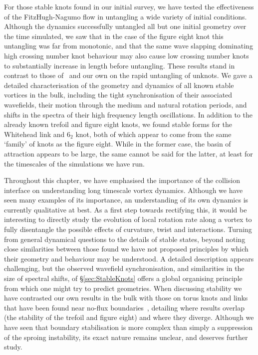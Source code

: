 For those stable knots found in our initial survey, we have tested the effectiveness of the FitzHugh-Nagumo flow in untangling a wide variety of initial conditions. Although the dynamics successfully untangled all but one initial geometry over the time simulated, we saw that in the case of the figure eight knot this untangling was far from monotonic, and that the same wave slapping dominating high crossing number knot behaviour may also cause low crossing number knots to substantially increase in length before untangling. These results stand in contrast to those of~\citep{Maucher2016} and our own on the rapid untangling of unknots. We gave a detailed characterisation of the geometry and dynamics of all known stable vortices in the bulk, including the tight synchronisation of their associated wavefields, their motion through the medium and natural rotation periods, and shifts in the spectra of their high frequency length oscillations. In addition to the already known trefoil and figure eight knots, we found stable forms for the Whitehead link and $6_2$ knot, both of which appear to come from the same `family' of knots as the figure eight. While in the former case, the basin of attraction appears to be large, the same cannot be said for the latter, at least for the timescales of the simulations we have run. 

Throughout this chapter, we have emphasised the importance of the collision interface on understanding long timescale vortex dynamics. Although we have seen many examples of its importance, an understanding of its own dynamics is currently qualitative at best. As a first step towards rectifying this, it would be interesting to directly study the evolution of local rotation rate along a vortex to fully disentangle the possible effects of curvature, twist and interactions. Turning from general dynamical questions to the details of stable states, beyond noting close similarities between those found we have not proposed principles by which their geometry and behaviour may be understood. A detailed description appears challenging, but the observed wavefield synchronisation, and similarities in the size of spectral shifts, of \S\ref{sec:StableKnots} offers a global organising principle from which one might try to predict geometries. When discussing stability we have contrasted our own results in the bulk with those on torus knots and links that have been found near no-flux boundaries~\citep{Maucher2017,Maucher2019}, detailing where results overlap (the stability of the trefoil and figure eight) and where they diverge. Although we have seen that boundary stabilisation is more complex than simply a suppression of the sproing instability, its exact nature remains unclear, and deserves further study. 

